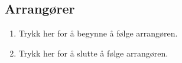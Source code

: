 \subsection{Arrangører}
\begin{center}
\end{center}
\begin{enumerate}[nosep]
    \item Trykk her for å begynne å følge arrangøren.
    \item Trykk her for å slutte å følge arrangøren.
\end{enumerate}

